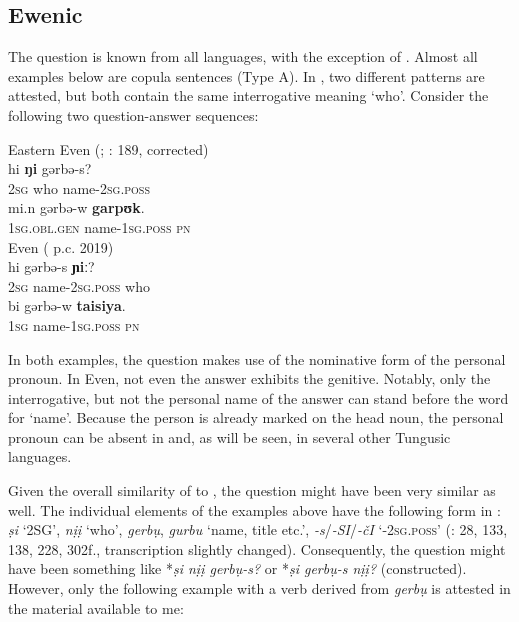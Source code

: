 \documentclass[output=paper,colorlinks,citecolor=brown]{langscibook}
\begin{document}
\subsection{Ewenic}\label{section4.4.3}

The question is known from all  languages, with the exception of . Almost all  examples below are copula sentences (Type A). In , two different patterns are attested, but both contain the same interrogative meaning ‘who’. Consider the following two question-answer sequences:

\ea \label{example4.55}
    Eastern Even (; \citealt{KimJuwon2011}: 189, corrected)\\
    \ea
    \gll hi		\textbf{ŋi}		gərbə-s?\\
    2\textsc{sg}		who		name-2\textsc{sg.poss}\\

    \ex
    \gll mi.n			gərbə-w			\textbf{garpʊk}.\\
    1\textsc{sg.obl.gen}		name-1\textsc{sg.poss}		\textsc{pn}\\
    \z
\ex \label{example4.56}
     Even ( p.c. 2019)\\
    \ea
    \gll hi		gərbə-s			\textbf{ɲiː}?\\
    2\textsc{sg}		name-2\textsc{sg.poss}		who\\

    \ex
    \gll bi		gərbə-w			\textbf{taisiya}.\\
    1\textsc{sg}		name-1\textsc{sg.poss}		\textsc{pn}\\
    \z
\z

\noindent In both examples, the question makes use of the nominative form of the personal pronoun. In  Even, not even the answer exhibits the genitive. Notably, only the interrogative, but not the personal name of the answer can stand before the word for ‘name’. Because the person is already marked on the head noun, the personal pronoun can be absent in  and, as will be seen, in several other Tungusic languages.

Given the overall similarity of  to , the question might have been very similar as well. The individual elements of the  examples above have the following form in : \textit{ṣi} ‘2SG’, \textit{nịị} ‘who’, \textit{gerbụ}, \textit{gurbu} ‘name, title etc.’, \textit{-s}/\textit{-SI}/\textit{-čI} ‘-2\textsc{sg.poss}’ (\citealt{Doerferetal2013}: 28, 133, 138, 228, 302f., transcription slightly changed). Consequently, the question might have been something like *\textit{ṣi nịị gerbụ-s?} or *\textit{ṣi gerbụ-s nịị?} (constructed). However, only the following example with a verb derived from \textit{gerbụ} is attested in the material available to me:
\end{document}
